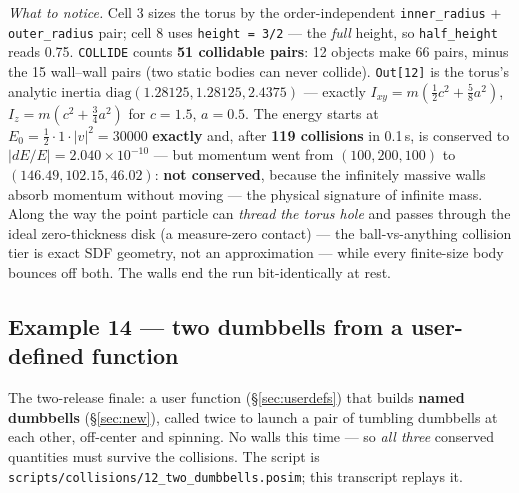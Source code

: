 \documentclass[11pt]{article}
\newcommand{\kw}[1]{\texttt{\uppercase{#1}}}
\newcommand{\code}[1]{\texttt{#1}}
\begin{document}
\emph{What to notice.} Cell 3 sizes the torus by the order-independent
\code{inner\_radius} + \code{outer\_radius} pair; cell 8 uses
\code{height = 3/2} --- the \emph{full} height, so \code{half\_height}
reads 0.75. \kw{collide} counts \textbf{51 collidable pairs}: 12
objects make 66 pairs, minus the 15 wall--wall pairs (two static
bodies can never collide). \code{Out[12]} is the torus's analytic
inertia $\mathrm{diag}(1.28125, 1.28125, 2.4375)$ --- exactly
$I_{xy} = m(\tfrac12 c^2 + \tfrac58 a^2)$,
$I_z = m(c^2 + \tfrac34 a^2)$ for $c = 1.5$, $a = 0.5$. The energy
starts at $E_0 = \tfrac12\cdot 1\cdot|v|^2 = 30000$ \textbf{exactly}
and, after \textbf{119 collisions} in 0.1\,s, is conserved to
$|dE/E| = 2.040\times10^{-10}$ --- but momentum went from
$(100, 200, 100)$ to $(146.49, 102.15, 46.02)$: \textbf{not
conserved}, because the infinitely massive walls absorb momentum
without moving --- the physical signature of infinite mass. Along the
way the point particle can \emph{thread the torus hole} and passes
through the ideal zero-thickness disk (a measure-zero contact) --- the
ball-vs-anything collision tier is exact SDF geometry, not an
approximation --- while every finite-size body bounces off both. The
walls end the run bit-identically at rest.

\subsection{Example 14 --- two dumbbells from a user-defined function}

The two-release finale: a user function (\S\ref{sec:userdefs}) that
builds \textbf{named dumbbells} (\S\ref{sec:new}), called twice to
launch a pair of tumbling dumbbells at each other, off-center and
spinning. No walls this time --- so \emph{all three} conserved
quantities must survive the collisions. The script is
\code{scripts/collisions/12\_two\_dumbbells.posim}; this transcript
replays it.
\end{document}
